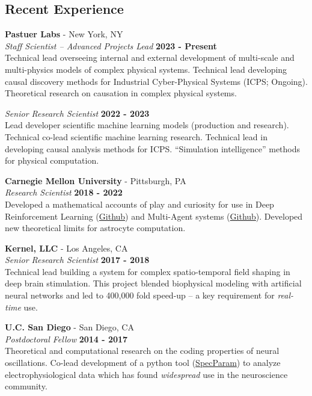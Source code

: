 \documentclass[margin,line]{res}
\begin{document}
\begin{resume}
\section{\sc Recent Experience}
\vspace{-.1cm}
{\bf Pastuer Labs} - New York, NY\\
{\em Staff Scientist -- Advanced Projects Lead} \hfill {\bf 2023 - Present}\\
Technical lead overseeing internal and external development of multi-scale and multi-physics models of complex physical systems. Technical lead developing causal discovery methods for Industrial Cyber-Physical Systems (ICPS; Ongoing). Theoretical research on causation in complex physical systems.

\vspace{-.2cm}
{\em Senior Research Scientist} \hfill {\bf 2022 - 2023}\\
Lead developer scientific machine learning models (production and research). Technical co-lead scientific machine learning research. Technical lead in developing causal analysis methods for ICPS. “Simulation intelligence” methods for physical computation.

\vspace{-.1cm}
{\bf Carnegie Mellon University} - Pittsburgh, PA \\
{\em Research Scientist} \hfill {\bf 2018 - 2022}\\
Developed a mathematical accounts of play and curiosity for use in Deep Reinforcement Learning (\href{https://github.com/CoAxLab/infomercial}{Github}) and Multi-Agent systems (\href{https://github.com/parenthetical-e/parkid}{Github}). Developed new theoretical limits for astrocyte computation. 

\vspace{-.1cm}
{\bf Kernel, LLC} - Los Angeles, CA\\
{\em Senior Research Scientist} \hfill {\bf 2017 - 2018}\\
Technical lead building a system for complex spatio-temporal field shaping in deep brain stimulation. This project blended biophysical modeling with artificial neural networks and led to 400,000 fold speed-up -- a key requirement for \emph{real-time} use.

\vspace{-.1cm}
{\bf U.C. San Diego} - San Diego, CA\\
{\em Postdoctoral Fellow} \hfill {\bf 2014 - 2017}\\
Theoretical and computational research on the coding properties of neural oscillations. Co-lead development of a python tool (\href{https://github.com/fooof-tools/fooof}{SpecParam}) to analyze electrophysiological data which has found \emph{widespread} use in the neuroscience community.


\end{resume}
\end{document}
